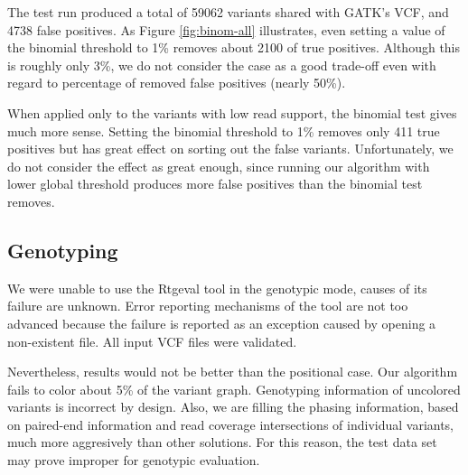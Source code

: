The test run produced a total of 59062 variants shared with GATK's VCF, and 4738 false positives. As Figure \ref{fig:binom-all} illustrates, even setting a value of the binomial threshold to 1\% removes about 2100 of true positives. Although this is roughly only 3\%, we do not consider the case as a good trade-off even with regard to percentage of removed false positives (nearly 50\%). 

When applied only to the variants with low read support, the binomial test gives much more sense. Setting the binomial threshold to 1\% removes only 411 true positives but has great effect on sorting out the false variants. Unfortunately, we do not consider the effect as great enough, since running our algorithm with lower global threshold produces more false positives than the binomial test removes.

\subsection{Genotyping}
\label{subsec:genotyping}

We were unable to use the Rtgeval tool in the genotypic mode, causes of its failure are unknown. Error reporting mechanisms of the tool are not too advanced because the failure is reported as an exception caused by opening a non-existent file. All input VCF files were validated.

Nevertheless, results would not be better than the positional case. Our algorithm fails to color about 5\% of the variant graph. Genotyping information of uncolored variants is incorrect by design. Also, we are filling the phasing information, based on paired-end information and read coverage intersections of individual variants, much more aggresively than other solutions. For this reason, the test data set may prove improper for genotypic evaluation.
